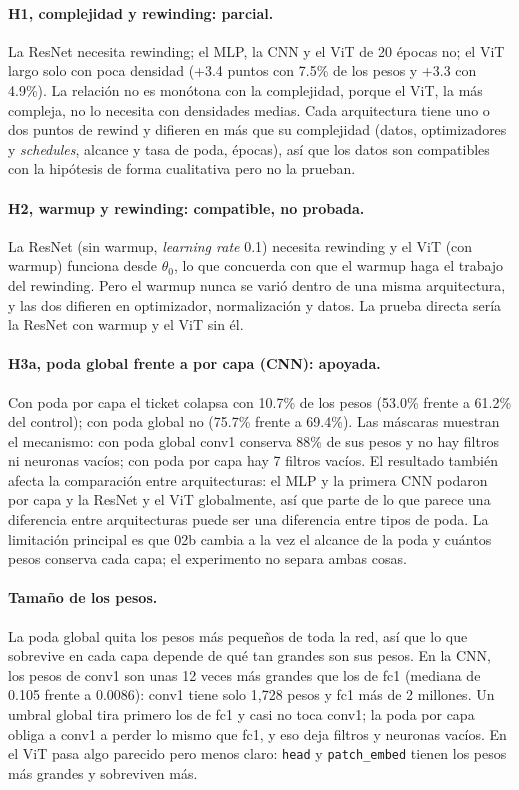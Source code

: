\documentclass[11pt]{article}
\begin{document}
\paragraph{H1, complejidad y rewinding: parcial.} La ResNet necesita rewinding; el MLP, la CNN y el ViT de 20 épocas no; el ViT largo solo con poca densidad (+3.4 puntos con 7.5\% de los pesos y +3.3 con 4.9\%). La relación no es monótona con la complejidad, porque el ViT, la más compleja, no lo necesita con densidades medias. Cada arquitectura tiene uno o dos puntos de rewind y difieren en más que su complejidad (datos, optimizadores y \textit{schedules}, alcance y tasa de poda, épocas), así que los datos son compatibles con la hipótesis de forma cualitativa pero no la prueban.

\paragraph{H2, warmup y rewinding: compatible, no probada.} La ResNet (sin warmup, \textit{learning rate} 0.1) necesita rewinding y el ViT (con warmup) funciona desde $\theta_0$, lo que concuerda con que el warmup haga el trabajo del rewinding. Pero el warmup nunca se varió dentro de una misma arquitectura, y las dos difieren en optimizador, normalización y datos. La prueba directa sería la ResNet con warmup y el ViT sin él.

\paragraph{H3a, poda global frente a por capa (CNN): apoyada.} Con poda por capa el ticket colapsa con 10.7\% de los pesos (53.0\% frente a 61.2\% del control); con poda global no (75.7\% frente a 69.4\%). Las máscaras muestran el mecanismo: con poda global conv1 conserva 88\% de sus pesos y no hay filtros ni neuronas vacíos; con poda por capa hay 7 filtros vacíos. El resultado también afecta la comparación entre arquitecturas: el MLP y la primera CNN podaron por capa y la ResNet y el ViT globalmente, así que parte de lo que parece una diferencia entre arquitecturas puede ser una diferencia entre tipos de poda. La limitación principal es que 02b cambia a la vez el alcance de la poda y cuántos pesos conserva cada capa; el experimento no separa ambas cosas.

\paragraph{Tamaño de los pesos.}\label{sec:magnitudes} La poda global quita los pesos más pequeños de toda la red, así que lo que sobrevive en cada capa depende de qué tan grandes son sus pesos. En la CNN, los pesos de conv1 son unas 12 veces más grandes que los de fc1 (mediana de 0.105 frente a 0.0086): conv1 tiene solo 1,728 pesos y fc1 más de 2 millones. Un umbral global tira primero los de fc1 y casi no toca conv1; la poda por capa obliga a conv1 a perder lo mismo que fc1, y eso deja filtros y neuronas vacíos. En el ViT pasa algo parecido pero menos claro: \texttt{head} y \texttt{patch\_embed} tienen los pesos más grandes y sobreviven más.
\end{document}
